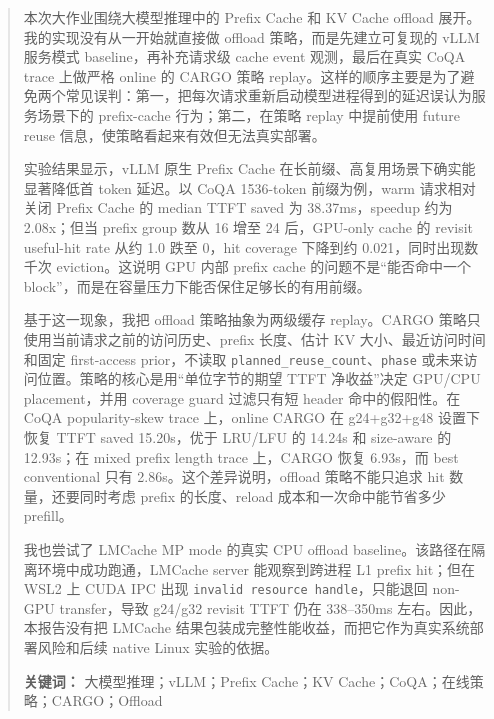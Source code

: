 \documentclass[UTF8,a4paper,10pt]{ctexart}
\begin{document}
\newpage
\thispagestyle{empty}
\renewcommand{\abstractname}{\kaishu \large \textbf{摘要}}
\begin{abstract}
本次大作业围绕大模型推理中的 Prefix Cache 和 KV Cache offload 展开。我的实现没有从一开始就直接做 offload 策略，而是先建立可复现的 vLLM 服务模式 baseline，再补充请求级 cache event 观测，最后在真实 CoQA trace 上做严格 online 的 CARGO 策略 replay。这样的顺序主要是为了避免两个常见误判：第一，把每次请求重新启动模型进程得到的延迟误认为服务场景下的 prefix-cache 行为；第二，在策略 replay 中提前使用 future reuse 信息，使策略看起来有效但无法真实部署。

实验结果显示，vLLM 原生 Prefix Cache 在长前缀、高复用场景下确实能显著降低首 token 延迟。以 CoQA 1536-token 前缀为例，warm 请求相对关闭 Prefix Cache 的 median TTFT saved 为 38.37ms，speedup 约为 2.08x；但当 prefix group 数从 16 增至 24 后，GPU-only cache 的 revisit useful-hit rate 从约 1.0 跌至 0，hit coverage 下降到约 0.021，同时出现数千次 eviction。这说明 GPU 内部 prefix cache 的问题不是“能否命中一个 block”，而是在容量压力下能否保住足够长的有用前缀。

基于这一现象，我把 offload 策略抽象为两级缓存 replay。CARGO 策略只使用当前请求之前的访问历史、prefix 长度、估计 KV 大小、最近访问时间和固定 first-access prior，不读取 \texttt{planned\_reuse\_count}、\texttt{phase} 或未来访问位置。策略的核心是用“单位字节的期望 TTFT 净收益”决定 GPU/CPU placement，并用 coverage guard 过滤只有短 header 命中的假阳性。在 CoQA popularity-skew trace 上，online CARGO 在 g24+g32+g48 设置下恢复 TTFT saved 15.20s，优于 LRU/LFU 的 14.24s 和 size-aware 的 12.93s；在 mixed prefix length trace 上，CARGO 恢复 6.93s，而 best conventional 只有 2.86s。这个差异说明，offload 策略不能只追求 hit 数量，还要同时考虑 prefix 的长度、reload 成本和一次命中能节省多少 prefill。

我也尝试了 LMCache MP mode 的真实 CPU offload baseline。该路径在隔离环境中成功跑通，LMCache server 能观察到跨进程 L1 prefix hit；但在 WSL2 上 CUDA IPC 出现 \texttt{invalid resource handle}，只能退回 non-GPU transfer，导致 g24/g32 revisit TTFT 仍在 338--350ms 左右。因此，本报告没有把 LMCache 结果包装成完整性能收益，而把它作为真实系统部署风险和后续 native Linux 实验的依据。

\par\noindent\textbf{关键词：} 大模型推理；vLLM；Prefix Cache；KV Cache；CoQA；在线策略；CARGO；Offload
\end{abstract}

\tableofcontents
\newpage
\setcounter{page}{1}
\end{document}
